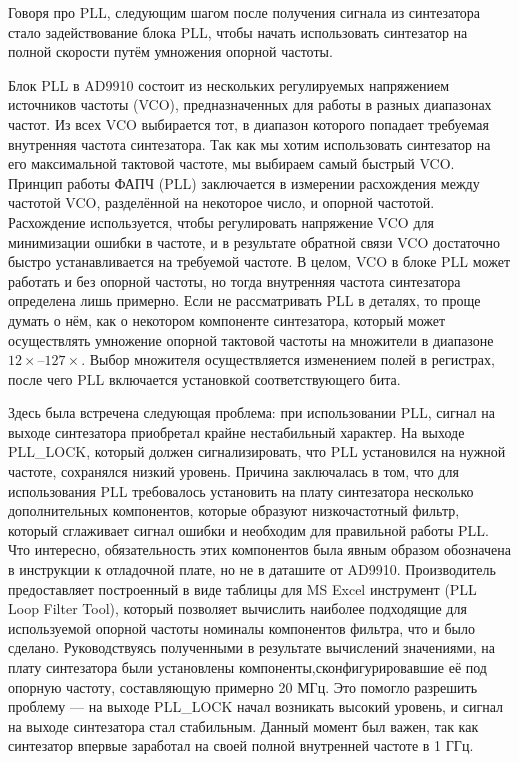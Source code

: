 \documentclass[rusmathsym, eqnumwithinsec, amspack, hyperref]{bomgost}
\begin{document}
Говоря про PLL, следующим шагом после получения сигнала из синтезатора стало задействование блока PLL, чтобы начать использовать синтезатор на полной скорости путём умножения опорной частоты.

Блок PLL в AD9910 состоит из нескольких регулируемых напряжением источников частоты (VCO), предназначенных для работы в разных диапазонах частот. Из всех VCO выбирается тот, в диапазон которого попадает требуемая внутренняя частота синтезатора. Так как мы хотим использовать синтезатор на его максимальной тактовой частоте, мы выбираем самый быстрый VCO. Принцип работы ФАПЧ (PLL) заключается в измерении расхождения между частотой VCO, разделённой на некоторое число, и опорной частотой. Расхождение используется, чтобы регулировать напряжение VCO для минимизации ошибки в частоте, и в результате обратной связи VCO достаточно быстро устанавливается на требуемой частоте. В целом, VCO в блоке PLL может работать и без опорной частоты, но тогда внутренняя частота синтезатора определена лишь примерно. Если не рассматривать PLL в деталях, то проще думать о нём, как о некотором компоненте синтезатора, который может осуществлять умножение опорной тактовой частоты на множители в диапазоне $12\times$--$127\times$. Выбор множителя осуществляется изменением полей в регистрах, после чего PLL включается установкой соответствующего бита.

Здесь была встречена следующая проблема: при использовании PLL, сигнал на выходе синтезатора приобретал крайне нестабильный характер. На выходе PLL\_LOCK, который должен сигнализировать, что PLL установился на нужной частоте, сохранялся низкий уровень. Причина заключалась в том, что для использования PLL требовалось установить на плату синтезатора несколько дополнительных компонентов, которые образуют низкочастотный фильтр, который сглаживает сигнал ошибки и необходим для правильной работы PLL. Что интересно, обязательность этих компонентов была явным образом обозначена в инструкции к отладочной плате, но не в даташите от AD9910. Производитель предоставляет построенный в виде таблицы для MS Excel инструмент (PLL Loop Filter Tool), который позволяет вычислить наиболее подходящие для используемой опорной частоты номиналы компонентов фильтра, что и было сделано. Руководствуясь полученными в результате вычислений значениями, на плату синтезатора были установлены компоненты,сконфигурировавшие её под опорную частоту, составляющую примерно 20 МГц. Это помогло разрешить проблему --- на выходе PLL\_LOCK начал возникать высокий уровень, и сигнал на выходе синтезатора стал стабильным. Данный момент был важен, так как синтезатор впервые заработал на своей полной внутренней частоте в 1 ГГц.
\end{document}
